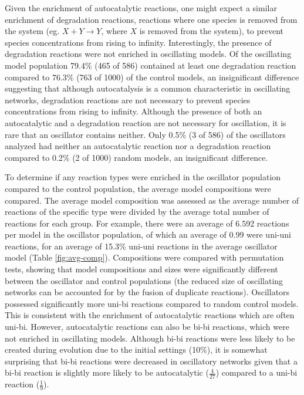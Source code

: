 \documentclass[12pt]{report}
\begin{document}
Given the enrichment of autocatalytic reactions, one might expect a similar enrichment of degradation reactions, reactions where one species is removed from the system (eg. $X + Y \to Y$, where $X$ is removed from the system), to prevent species concentrations from rising to infinity. Interestingly, the presence of degradation reactions were not enriched in oscillating models. Of the oscillating model population 79.4\% (465 of 586) contained at least one degradation reaction compared to 76.3\% (763 of 1000) of the control models, an insignificant difference suggesting that although autocatalysis is a common characteristic in oscillating networks, degradation reactions are not necessary to prevent species concentrations from rising to infinity.  Although the presence of both an autocatalytic and a degradation reaction are not necessary for oscillation, it is rare that an oscillator contains neither. Only 0.5\% (3 of 586) of the oscillators analyzed had neither an autocatalytic reaction nor a degradation reaction compared to 0.2\% (2 of 1000) random models, an insignificant difference.

To determine if any reaction types were enriched in the oscillator population compared to the control population, the average model compositions were compared. The average model composition was assessed as the average number of reactions of the specific type were divided by the average total number of reactions for each group. For example, there were an average of 6.592 reactions per model in the oscillator population, of which an average of 0.99 were uni-uni reactions, for an average of 15.3\% uni-uni reactions in the average oscillator model (Table \ref{fig:avg-comp}). Compositions were compared with permutation tests, showing that model compositions and sizes were significantly different between the oscillator and control populations (the reduced size of oscillating networks can be accounted for by the fusion of duplicate reactions). Oscillators possessed significantly more uni-bi reactions compared to random control models. This is consistent with the enrichment of autocatalytic reactions which are often uni-bi. However, autocatalytic reactions can also be bi-bi reactions, which were not enriched in oscillating models. Although bi-bi reactions were less likely to be created during evolution due to the initial settings (10\%), it is somewhat surprising that bi-bi reactions were decreased in oscillatory networks given that a bi-bi reaction is slightly more likely to be autocatalytic ($\frac{4}{27}$) compared to a uni-bi reaction ($\frac{1}{9}$).
\end{document}
